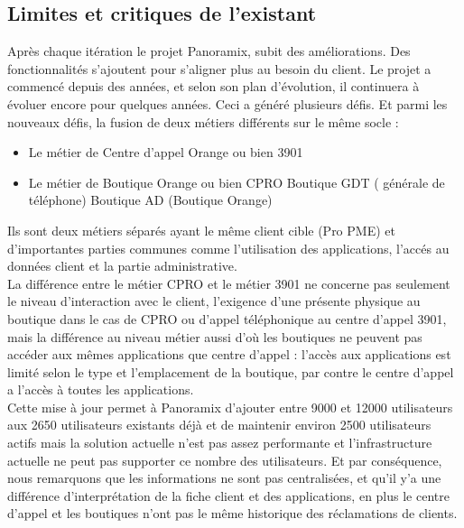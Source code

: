 \subsection[Limites et critiques de l’existant]{Limites et critiques de l’existant}
Après chaque itération le projet Panoramix, subit des améliorations. Des fonctionnalités s’ajoutent pour s’aligner plus au besoin du client. Le projet a commencé depuis des années, et selon son plan d’évolution, il continuera à évoluer encore pour quelques années. Ceci a généré plusieurs défis. Et parmi les nouveaux défis, la fusion de deux métiers différents sur le  même socle :
\begin{itemize}
	\item Le métier de Centre d’appel Orange ou bien 3901
	\item Le métier de Boutique Orange ou bien CPRO
		\subitem \textbullet Boutique GDT ( générale de téléphone)
		\subitem \textbullet Boutique AD (Boutique Orange)
\end{itemize}
Ils sont deux métiers séparés ayant le même client cible (Pro PME) et d'importantes parties communes comme l'utilisation des applications, l'accés au données client et la partie administrative.\\
La différence entre le métier CPRO et le métier 3901 ne concerne pas seulement le niveau d’interaction avec le client, l'exigence d'une présente physique au boutique dans le cas de CPRO ou d'appel téléphonique au centre d'appel 3901, mais la différence au niveau métier aussi d'où les boutiques ne peuvent pas accéder aux mêmes applications que centre d’appel : l’accès aux applications est limité selon le type et l’emplacement de la boutique, par contre le centre d’appel a l’accès à toutes les applications.\\
Cette mise à jour permet à Panoramix d’ajouter entre 9000 et 12000 utilisateurs aux 2650 utilisateurs existants déjà et  de maintenir environ 2500 utilisateurs actifs mais la solution actuelle n’est pas assez performante et l’infrastructure actuelle ne peut pas supporter ce nombre des utilisateurs. Et par conséquence, nous remarquons que les informations ne sont pas centralisées, et qu'il y’a une différence d’interprétation de la fiche client et des applications, en plus le centre d’appel et les boutiques n’ont pas le même historique des réclamations de clients.
